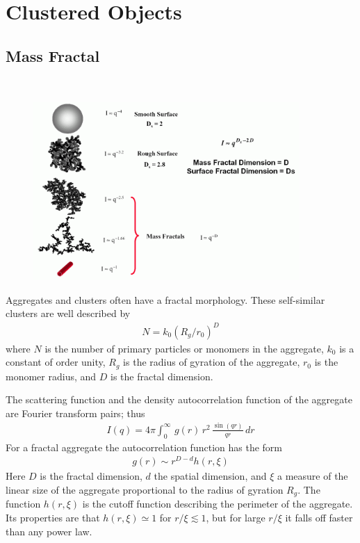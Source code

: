
\section{Clustered Objects}
\label{sect:ClusteredObjects}

\subsection{Mass Fractal
\cite{Sorensen1999,Sorensen1992,Hurd1988,Lin1989,Lin1990,Lin1990a}}
\label{sect:MassFractal}
\hspace{1pt} \\

\begin{figure}[htb]
\begin{center}
\includegraphics[width=0.9\textwidth,height=0.60665\textwidth]{../images/form_factor/cluster/fractaldimension.png}
\end{center}
\caption{} \label{fractaldimension}
\end{figure}

Aggregates and clusters often have a fractal morphology. These self-similar clusters are well
described by
\begin{align}
N=k_0(R_g/r_0)^D
\end{align}
where $N$ is the number of primary particles or monomers in the aggregate,
$k_0$ is a constant of order unity, $R_g$ is the radius of gyration of the aggregate,
$r_0$ is the monomer radius, and $D$ is the fractal dimension.

The scattering function and the density autocorrelation function
of the aggregate are Fourier transform pairs; thus
\begin{align}
I(q)=4\pi \int_0^\infty \, g(r)\, r^2\, \frac{\sin(qr)}{qr}\, dr
\label{eq:aggregateSQ}
\end{align}
For a fractal aggregate the autocorrelation function has the
form
\begin{align}
g(r) \sim r^{D-d} h(r,\xi)
\label{eq:aggregate_g(r)}
\end{align}
Here $D$ is the fractal dimension, $d$ the spatial dimension, and
$\xi$ a measure of the linear size of the aggregate proportional to
the radius of gyration $R_g$. The function $h(r,\xi)$ is the cutoff
function describing the perimeter of the aggregate. Its properties
are that $h(r,\xi) \simeq 1$ for $r/\xi \lesssim 1$, but for large
$r/\xi$ it falls off faster than any power law.


